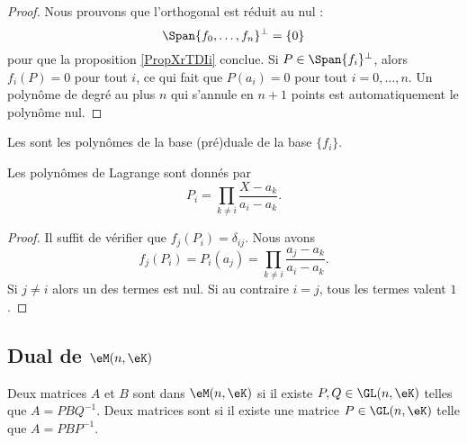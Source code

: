 \begin{proof}
    Nous prouvons que l'orthogonal est réduit au nul :
    \begin{equation}
        \Span\{ f_0,\ldots, f_n \}^{\perp}=\{ 0 \}
    \end{equation}
    pour que la proposition \ref{PropXrTDIi} conclue. Si \( P\in\Span\{ f_i \}^{\perp}\), alors \( f_i(P)=0\) pour tout \( i\), ce qui fait que \( P(a_i)=0\) pour tout \( i=0,\ldots, n\). Un polynôme de degré au plus \( n\) qui s'annule en \( n+1\) points est automatiquement le polynôme nul.
\end{proof}

Les  sont les polynômes de la base (pré)duale de la base \( \{ f_i \}\).

\begin{proposition}
    Les polynômes de Lagrange sont donnés par
    \begin{equation}
        P_i=\prod_{k\neq i}\frac{ X-a_k }{ a_i-a_k }.
    \end{equation}
\end{proposition}

\begin{proof}
    Il suffit de vérifier que \( f_j(P_i)=\delta_{ij}\). Nous avons
    \begin{equation}
        f_j(P_i)=P_i(a_j)=\prod_{k\neq i}\frac{ a_j-a_k }{ a_i-a_k }.
    \end{equation}
    Si \( j\neq i\) alors un des termes est nul. Si au contraire \( i=j\), tous les termes valent \( 1\).
\end{proof}

\subsection{Dual de \texorpdfstring{$ \eM(n,\eK)$}{M(n,K)}}

\begin{definition}
    Deux matrices \( A\) et \( B\) sont  dans \( \eM(n,\eK)\) si il existe \( P,Q\in\GL(n,\eK)\) telles que \( A=PBQ^{-1}\). Deux matrices sont  si il existe une matrice \( P\in \GL(n,\eK)\) telle que \( A=PBP^{-1}\).
\end{definition}

